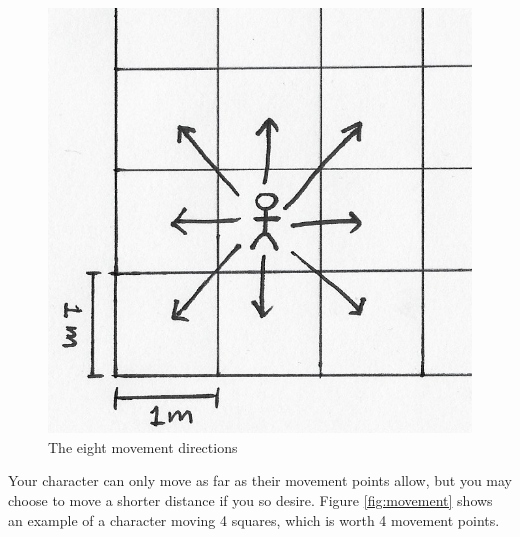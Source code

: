 \begin{figure}
    \centering
    \includegraphics{graphics/directions.png}
    \caption{The eight movement directions}
    \label{fig:directions}
\end{figure}

Your character can only move as far as their movement points allow, but you may choose to move a shorter distance if you so desire. Figure \ref{fig:movement} shows an example of a character moving 4 squares, which is worth 4 movement points.

